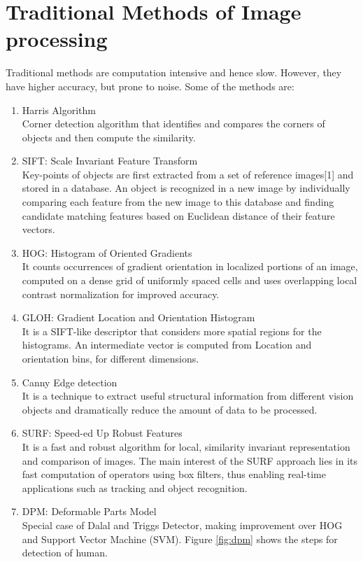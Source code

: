 \section{Traditional Methods of Image processing}
Traditional methods are computation intensive and hence slow. However, they have higher accuracy, but prone to noise. Some of the methods are:
\begin{enumerate}
	\item Harris Algorithm \\
			Corner detection algorithm that identifies and compares the corners of objects and then compute the similarity.
	\item SIFT: Scale Invariant Feature Transform\\
			Key-points of objects are first extracted from a set of reference images[1] and stored in a database. An object is recognized in a new image by individually comparing each feature from the new image to this database and finding candidate matching features based on Euclidean distance of their feature vectors. 
	\item HOG: Histogram of Oriented Gradients \\
			It counts occurrences of gradient orientation in localized portions of an image, computed on a dense grid of uniformly spaced cells and uses overlapping local contrast normalization for improved accuracy.
	\item GLOH: Gradient Location and Orientation Histogram \\
			It is a SIFT-like descriptor that considers more spatial regions for the histograms. An intermediate vector is computed from Location and orientation bins, for different dimensions.
	\item Canny Edge detection \\
		It is a technique to extract useful structural information from different vision objects and dramatically reduce the amount of data to be processed.
	\item SURF: Speed-ed Up Robust Features \\
			It is a fast and robust algorithm for local, similarity invariant representation and comparison of images. The main interest of the SURF approach lies in its fast computation of operators using box filters, thus enabling real-time applications such as tracking and object recognition. 
	\item DPM: Deformable Parts Model \\
			Special case of Dalal and Triggs Detector, making improvement over HOG and Support Vector Machine (SVM). Figure \ref{fig:dpm} shows the steps for detection of human.
\end{enumerate} 



